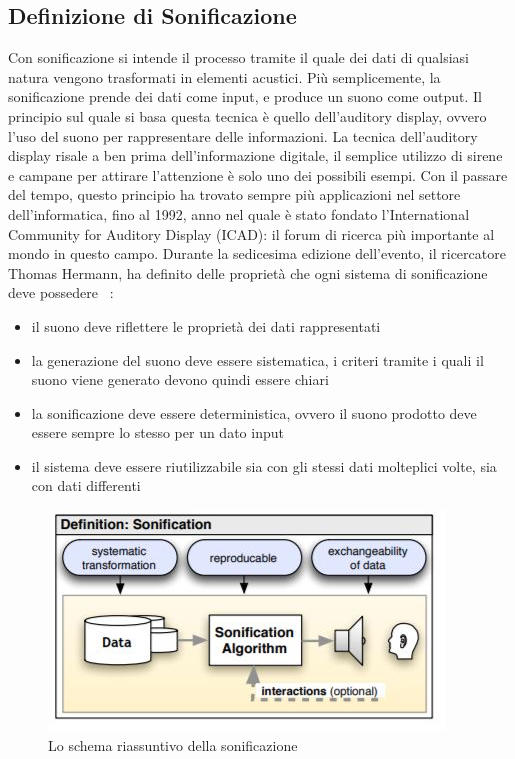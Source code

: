 \subsection{Definizione di Sonificazione}
Con sonificazione si intende il processo tramite il quale dei dati di qualsiasi natura vengono trasformati in elementi acustici.
Più semplicemente, la sonificazione prende dei dati come input, e produce un suono come output.
Il principio sul quale si basa questa tecnica è quello dell'auditory display, ovvero l'uso del suono per rappresentare delle informazioni.
La tecnica dell'auditory display risale a ben prima dell'informazione digitale, il semplice utilizzo di sirene e campane per attirare l'attenzione è solo uno dei possibili esempi.
Con il passare del tempo, questo principio ha trovato sempre più applicazioni nel settore dell'informatica, fino al 1992, anno nel quale è stato fondato l'International Community for Auditory Display (ICAD): il forum di ricerca più importante al mondo in questo campo.
Durante la sedicesima edizione dell'evento, il ricercatore Thomas Hermann, ha definito delle proprietà che ogni sistema di sonificazione deve possedere ~\cite{hermann}:
\begin{itemize}
  \item{il suono deve riflettere le proprietà dei dati rappresentati}
  \item{la generazione del suono deve essere sistematica, i criteri tramite i quali il suono viene generato devono quindi essere chiari}
  \item{la sonificazione deve essere deterministica, ovvero il suono prodotto deve essere sempre lo stesso per un dato input}
  \item{il sistema deve essere riutilizzabile sia con gli stessi dati molteplici volte, sia con dati differenti}
\end{itemize}
\begin{figure}[H]
  \includegraphics[width=\linewidth,scale=0.5]{img/schema.png}
  \caption{Lo schema riassuntivo della sonificazione}
  \label{fig:sonification_scheme}
\end{figure}


